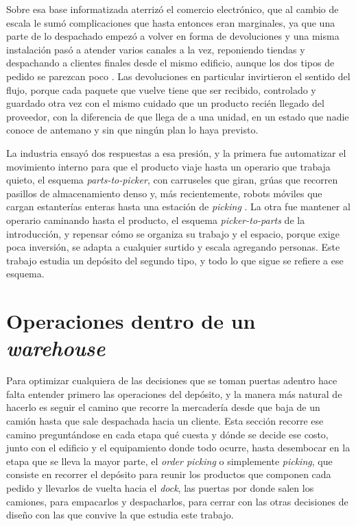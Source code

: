 Sobre esa base informatizada aterrizó el comercio electrónico, que al cambio de escala le sumó complicaciones que hasta entonces eran marginales, ya que una parte de lo despachado empezó a volver en forma de devoluciones y una misma instalación pasó a atender varios canales a la vez, reponiendo tiendas y despachando a clientes finales desde el mismo edificio, aunque los dos tipos de pedido se parezcan poco \citep{boysen2019warehousing}.
Las devoluciones en particular invirtieron el sentido del flujo, porque cada paquete que vuelve tiene que ser recibido, controlado y guardado otra vez con el mismo cuidado que un producto recién llegado del proveedor, con la diferencia de que llega de a una unidad, en un estado que nadie conoce de antemano y sin que ningún plan lo haya previsto.

La industria ensayó dos respuestas a esa presión, y la primera fue automatizar el movimiento interno para que el producto viaje hasta un operario que trabaja quieto, el esquema \emph{parts-to-picker}, con carruseles que giran, grúas que recorren pasillos de almacenamiento denso y, más recientemente, robots móviles que cargan estanterías enteras hasta una estación de \emph{picking} \citep{boysen2019warehousing}.
La otra fue mantener al operario caminando hasta el producto, el esquema \emph{picker-to-parts} de la introducción, y repensar cómo se organiza su trabajo y el espacio, porque exige poca inversión, se adapta a cualquier surtido y escala agregando personas.
Este trabajo estudia un depósito del segundo tipo, y todo lo que sigue se refiere a ese esquema.

\section{Operaciones dentro de un \emph{warehouse}}
\label{sec:operaciones}

Para optimizar cualquiera de las decisiones que se toman puertas adentro hace falta entender primero las operaciones del depósito, y la manera más natural de hacerlo es seguir el camino que recorre la mercadería desde que baja de un camión hasta que sale despachada hacia un cliente.
Esta sección recorre ese camino preguntándose en cada etapa qué cuesta y dónde se decide ese costo, junto con el edificio y el equipamiento donde todo ocurre, hasta desembocar en la etapa que se lleva la mayor parte, el \emph{order picking} o simplemente \emph{picking}, que consiste en recorrer el depósito para reunir los productos que componen cada pedido y llevarlos de vuelta hacia el \emph{dock}, las puertas por donde salen los camiones, para empacarlos y despacharlos, para cerrar con las otras decisiones de diseño con las que convive la que estudia este trabajo.

